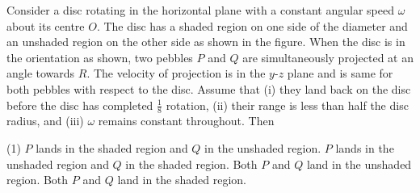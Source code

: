 
\item Consider a disc rotating in the horizontal plane with a constant angular speed $\omega$ about its centre $O$. The disc has a shaded region on one side of the diameter and an unshaded region on the other side as shown in the figure. When the disc is in the orientation as shown, two pebbles $P$ and $Q$ are simultaneously projected at an angle towards $R$. The velocity of projection is in the $y$-$z$ plane and is same for both pebbles with respect to the disc. Assume that (i) they land back on the disc before the disc has completed $\frac{1}{8}$ rotation, (ii) their range is less than half the disc radius, and (iii) $\omega$ remains constant throughout. Then
    \begin{center}
    \end{center}
    \begin{tasks}(1)
        \task $P$ lands in the shaded region and $Q$ in the unshaded region.
        \task $P$ lands in the unshaded region and $Q$ in the shaded region.
        \task Both $P$ and $Q$ land in the unshaded region.
        \task Both $P$ and $Q$ land in the shaded region.
    \end{tasks}

